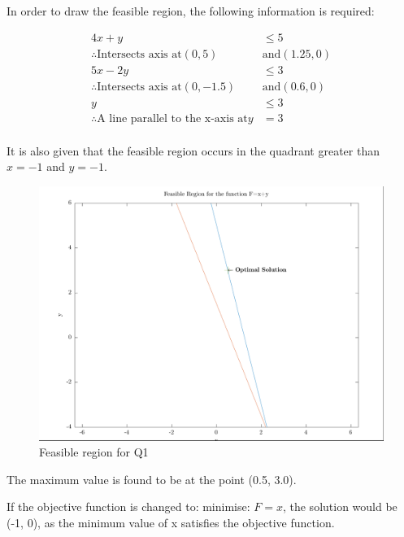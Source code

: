 In order to draw the feasible region, the following information is required:

\begin{align*}
	4x + y &\le 5 \\
	\therefore \text{Intersects axis at} (0,5) &\text{and} (1.25,0) \\
	5x - 2y &\le 3 \\
	\therefore \text{Intersects axis at} (0,-1.5) &\text{and} (0.6, 0) \\
	y &\le 3 \\
	\therefore \text{A line parallel to the x-axis at} y &= 3 \\
\end{align*}

It is also given that the feasible region occurs in the quadrant greater than
$x=-1$ and  $y=-1$.

\begin{figure}[H]
	\centering
	\includegraphics[width=\textwidth]{images/Q1}
	\caption{Feasible region for Q1}
	\label{fig:images-Q1}
\end{figure}

The maximum value is found to be at the point (0.5, 3.0).

If the objective function is changed to: minimise: $F=x$, the solution would be
(-1, 0), as the minimum value of x satisfies the objective function.
